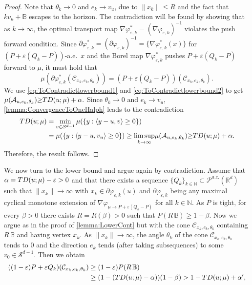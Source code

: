 \documentclass[11pt]{article}
\newcommand{\R}{\mathbb{R}}
\newcommand{\N}{\mathbb{N}}
\newcommand{\eps}{\varepsilon}
\theoremstyle{plain}
\theoremstyle{definition}
\begin{document}
\begin{proof}
Note that $\theta_k\to 0  $ and $e_k\to v_u$, due to $\|x_k\|\leq R$ and the fact that $k v_u+\mathbb{B}$ escapes to the horizon.   The contradiction will be found by showing that as $k\to \infty$, the optimal transport map $\nabla \varphi_{\eps,k}^*=(\nabla \varphi_{\eps,k})^{-1}$ violates the push forward condition. 
Since  $\partial  \varphi_{\eps,k}^*= (\partial  \varphi_{\eps,k})^{-1}= \{\nabla  \varphi_{\eps,k}^*(x)\}$ for $(P+\eps (Q_{k}-P))$-a.e.\ $x$ and the Borel map $\nabla  \varphi_{\eps,k}^*$ pushes $P+\eps (Q_{k}-P)$ forward to $\mu$, it must hold that 
$$ \mu(\partial  \varphi_{\eps,k}^*(\mathcal{C}_{x_k,e_k,\theta_n}))= (P+\eps (Q_{k}-P))(\mathcal{C}_{x_k,e_k,\theta_k}).$$
We use \eqref{eq:ToContradictlowerbound1} and \eqref{eq:ToContradictlowerbound2} to get 
$ \mu(\mathcal{A}_{u,e_k,\theta_k}) {\geq } {\rm TD}(u;\mu)+\alpha.$ Since $\theta_k\to 0$ and $e_k\to v_u$, \autoref{lemma:ConvergenceToOneHalph} leads to the contradiction
\begin{align*}
      {\rm TD}(u;\mu)&=\min_{v\in \mathcal{S}^{d-1}}\mu(\{ y: 
      \langle  y-u, v\rangle\geq 
0  \} )\\
&=\mu(\{ y: 
      \langle  y-u, v_u\rangle\geq 
0  \} )
\geq  {\limsup_{k\to \infty}}\mu(\mathcal{A}_{u,e_k,\theta_k}) {\geq }{\rm TD}(u;\mu)+\alpha.
\end{align*}
Therefore, the result follows. 
\end{proof}
We now turn to the lower bound and argue again  by contradiction. Assume that  $\alpha={\rm TD}(u;\mu)-\eps>0$ and that there exists a sequence $\{Q_k\}_{k\in \N}\subset  \mathcal{P}^{a.c.}(\R^d)$ such that  $\|x_k\|\to \infty $ with $ x_k \in \partial \varphi_{\eps,k}(u)$ and $\partial \varphi_{\eps,k} $  being any maximal {  cyclical} monotone extension of $\nabla \varphi_{\mu\to P+\eps (Q_k-P)}$ for all $k\in \N$. As $P$ is tight, for every $\beta>0$ there exists $R=R(\beta)>0$ such that $P(R\,\mathbb{B})\geq 1-\beta$.  Now we argue as in the proof of \autoref{lemma:LowerCont} but with the cone $\mathcal{C}_{x_k,e_k,\theta_k}$ containing $R\,\mathbb{B}$ and having vertex $x_k$.    As $\|x_k\|\to \infty$, the angle $\theta_k$ of the cone $\mathcal{C}_{x_k,e_k,\theta_k}$ tends to $0$ and the direction $e_k$ tends (after taking subsequences)  to some $v_0\in \mathcal{S}^{d-1}$. Then we obtain 
\begin{align*}
    ((1-\eps)P+ \eps Q_{k})(\mathcal{C}_{x_k,e_k,\theta_k})&\geq  (1-\eps)P (R\, \mathbb{B})\\
    &\geq (1-({\rm TD}(u;\mu)-\alpha))(1-\beta)> 1-{\rm TD}(u;\mu)+\alpha',
\end{align*}
\end{document}

